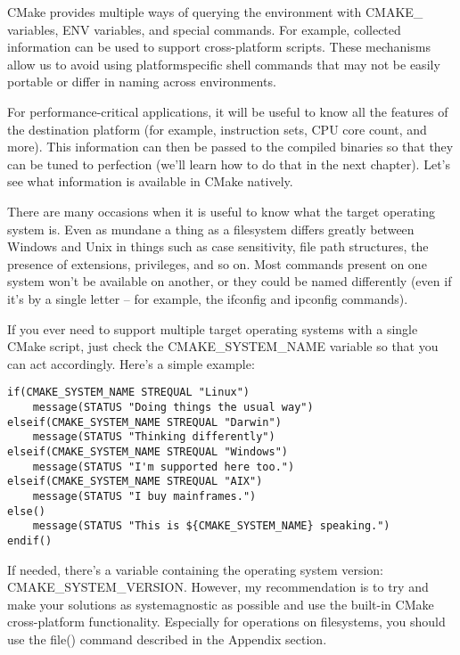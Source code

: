 
CMake provides multiple ways of querying the environment with CMAKE\_ variables, ENV variables, and special commands. For example, collected information can be used to support cross-platform scripts. These mechanisms allow us to avoid using platformspecific shell commands that may not be easily portable or differ in naming across environments.

For performance-critical applications, it will be useful to know all the features of the destination platform (for example, instruction sets, CPU core count, and more). This information can then be passed to the compiled binaries so that they can be tuned to perfection (we'll learn how to do that in the next chapter). Let's see what information is available in CMake natively.


There are many occasions when it is useful to know what the target operating system is. Even as mundane a thing as a filesystem differs greatly between Windows and Unix in things such as case sensitivity, file path structures, the presence of extensions, privileges, and so on. Most commands present on one system won't be available on another, or they could be named differently (even if it's by a single letter – for example, the ifconfig and ipconfig commands).

If you ever need to support multiple target operating systems with a single CMake script, just check the CMAKE\_SYSTEM\_NAME variable so that you can act accordingly. Here's a simple example:

\begin{lstlisting}[style=styleCMake]
if(CMAKE_SYSTEM_NAME STREQUAL "Linux")
	message(STATUS "Doing things the usual way")
elseif(CMAKE_SYSTEM_NAME STREQUAL "Darwin")
	message(STATUS "Thinking differently")
elseif(CMAKE_SYSTEM_NAME STREQUAL "Windows")
	message(STATUS "I'm supported here too.")
elseif(CMAKE_SYSTEM_NAME STREQUAL "AIX")
	message(STATUS "I buy mainframes.")
else()
	message(STATUS "This is ${CMAKE_SYSTEM_NAME} speaking.")
endif()
\end{lstlisting}

If needed, there's a variable containing the operating system version: CMAKE\_SYSTEM\_VERSION. However, my recommendation is to try and make your solutions as systemagnostic as possible and use the built-in CMake cross-platform functionality. Especially for operations on filesystems, you should use the file() command described in the Appendix section.

